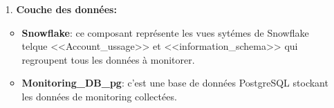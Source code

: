     \begin{enumerate}

        \item[1.] \textbf{Couche des données: } 
                \begin{itemize}
                \item \textbf{Snowflake}: ce composant représente les vues sytémes de Snowflake telque <<Account\_ussage>> et <<information\_schema>> qui regroupent tous les données à monitorer.
                \item \textbf{Monitoring\_DB\_pg}: c'est une base de données PostgreSQL stockant les données de monitoring collectées.
            \end{itemize}
            

\end{enumerate}
